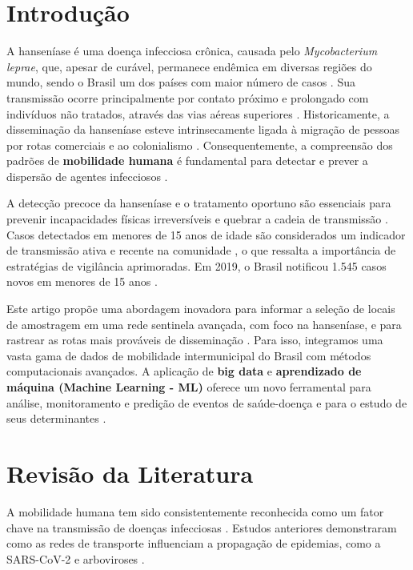 \documentclass[preprint,12pt]{elsarticle}
\begin{document}
\section{Introdução}
A hanseníase é uma doença infecciosa crônica, causada pelo \textit{Mycobacterium leprae}, que, apesar de curável, permanece endêmica em diversas regiões do mundo, sendo o Brasil um dos países com maior número de casos \cite{inovacao2024computacional, ministerio2022protocolo, leprae2022causada}. Sua transmissão ocorre principalmente por contato próximo e prolongado com indivíduos não tratados, através das vias aéreas superiores \cite{inovacao2024modelagem, bacilo2022principal}. Historicamente, a disseminação da hanseníase esteve intrinsecamente ligada à migração de pessoas por rotas comerciais e ao colonialismo \cite{inovacao2024modelagem, roberts2018bioarchaeology, ministerio2022protocolo}. Consequentemente, a compreensão dos padrões de \textbf{mobilidade humana} é fundamental para detectar e prever a dispersão de agentes infecciosos \cite{oliveira2024summary, inovacao2024modelagem, lima2022climate, saldanha2021resumo}.

A detecção precoce da hanseníase e o tratamento oportuno são essenciais para prevenir incapacidades físicas irreversíveis e quebrar a cadeia de transmissão \cite{inovacao2024analise, hanseniase2022objetivos, saude2022equipes}. Casos detectados em menores de 15 anos de idade são considerados um indicador de transmissão ativa e recente na comunidade \cite{inovacao2024analise, hanseniase2022objetivos, crianca2022gravidade}, o que ressalta a importância de estratégias de vigilância aprimoradas. Em 2019, o Brasil notificou 1.545 casos novos em menores de 15 anos \cite{boletim2021epidemiologico}.

Este artigo propõe uma abordagem inovadora para informar a seleção de locais de amostragem em uma rede sentinela avançada, com foco na hanseníase, e para rastrear as rotas mais prováveis de disseminação \cite{oliveira2024summary}. Para isso, integramos uma vasta gama de dados de mobilidade intermunicipal do Brasil com métodos computacionais avançados. A aplicação de \textbf{big data} e \textbf{aprendizado de máquina (Machine Learning - ML)} oferece um novo ferramental para análise, monitoramento e predição de eventos de saúde-doença e para o estudo de seus determinantes \cite{inovacao2024computacional, mooney2018big, saldanha2021resumo, saldanha2021ambito}.

\section{Revisão da Literatura}
A mobilidade humana tem sido consistentemente reconhecida como um fator chave na transmissão de doenças infecciosas \cite{oliveira2024summary, inovacao2024modelagem, lima2022climate, lima2022dynamics, tang2021fields}. Estudos anteriores demonstraram como as redes de transporte influenciam a propagação de epidemias, como a SARS-CoV-2 \cite{oliveira2024summary, inovacao2024modelagem, silva2022machine} e arboviroses \cite{inovacao2024modelagem, lima2022temporal, lima2022climate}.
\end{document}
